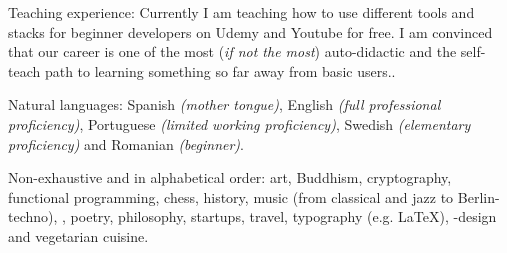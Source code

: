 \documentclass[10pt,a4paper]{article}
\begin{document}
\spacedhrule{0.5em}{-0.4em}


\inlineheadsection  %
  {Teaching experience:}
  {  Currently I am teaching how to use different tools and stacks for beginner developers on Udemy and Youtube for free. I am convinced that our career is one of the most (\emph{if not the most}) auto-didactic and the self-teach path to learning something so far away from basic users..}

\vspace{0.5em}
\inlineheadsection
  {Natural languages:}
  {Spanish \emph{(mother tongue)}, English \emph{(full professional proficiency)}, Portuguese \emph{(limited working proficiency)}, Swedish \emph{(elementary proficiency)} and Romanian \emph{(beginner)}.}


\spacedhrule{1.6em}{-0.4em}


\inlineheadsection
  {Non-exhaustive and in alphabetical order:}
  {art, Buddhism, cryptography, functional programming, chess, history, music (from classical and jazz to Berlin-techno), , poetry, philosophy, startups, travel, typography (e.g. \LaTeX), -design and vegetarian cuisine.}
\end{document}

